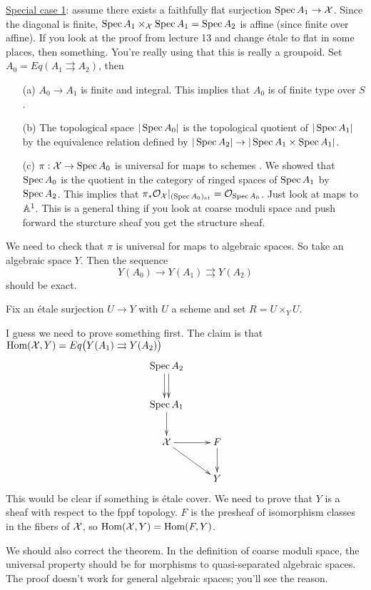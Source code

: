 \underline{Special case 1}: assume there exists a faithfully flat
surjection $\spec A_1\to \X$. Since the diagonal is finite, $\spec
A_1\times_\X \spec A_1=\spec A_2$ is affine (since finite over
affine). If you look at the proof from lecture 13 and change \'etale
to flat in some places, then something. You're really using that this
is really a groupoid. Set $A_0=Eq(A_1\rightrightarrows A_2)$, then
\begin{enumerate}
  \item[(a)] $A_0\to A_1$ is finite and integral. This implies that
$A_0$ is of finite type over $S$ \cite[7.8]{Atiyah-Macdonald}.
  \item[(b)] The topological space $|\spec A_0|$ is the topological
quotient of $|\spec A_1|$ by the equivalence relation defined by
$|\spec A_2|\to |\spec A_1\times \spec A_1|$.
  \item[(c)] $\pi:\X\to \spec A_0$ is universal for maps to schemes
. We showed that $\spec A_0$ is the quotient
in the category of ringed spaces of $\spec A_1$ by $\spec A_2$. This
implies that $\pi_*\O_\X|_{(\spec A_0)_{et}}=\O_{\spec A_0}$. Just
look at maps to $\AA^1$. This is a general thing if you look at
coarse moduli space and push forward the sturcture sheaf you get the
structure sheaf.
\end{enumerate}
We need to check that $\pi$ is universal for maps to algebraic
spaces. So take an algebraic space $Y$. Then the sequence
\[
  Y(A_0)\to Y(A_1)\rightrightarrows Y(A_2)
\]
should be exact.

Fix an \'etale surjection $U\to Y$ with $U$ a scheme and set
$R=U\times_Y U$.

I guess we need to prove something first. The claim is that
$\hom(\X,Y)=Eq\bigl(Y(A_1)\rightrightarrows Y(A_2)\bigr)$
\[\xymatrix{
  \spec A_2 \ar@<.5ex>[d]\ar@<-.5ex>[d]\\
  \spec A_1\ar[d]\\
  \X \ar[r]\ar[dr] & F\ar[d]\\
  & Y
}\]
This would be clear if something \anton{} is \'etale cover. We need
to prove that $Y$ is a sheaf with respect to the fppf topology.
 $F$ is the presheaf of isomorphism classes in the
fibers of $\X$, so $\hom(\X,Y)=\hom(F,Y)$.

We should also correct the theorem. In the definition of coarse
moduli space, the universal property should be for morphisms to
quasi-separated algebraic spaces. The proof doesn't work for general
algebraic spaces; you'll see the reason.

